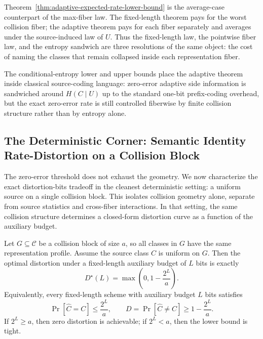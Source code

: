 \begin{remark}
Theorem~\ref{thm:adaptive-expected-rate-lower-bound} is the average-case counterpart of the max-fiber law. The fixed-length theorem pays for the worst collision fiber; the adaptive theorem pays for each fiber separately and averages under the source-induced law of $U$. Thus the fixed-length law, the pointwise fiber law, and the entropy sandwich are three resolutions of the same object: the cost of naming the classes that remain collapsed inside each representation fiber.
\end{remark}

\begin{remark}
The conditional-entropy lower and upper bounds place the adaptive theorem inside classical source-coding language: zero-error adaptive side information is sandwiched around $H(C\mid U)$ up to the standard one-bit prefix-coding overhead, but the exact zero-error rate is still controlled fiberwise by finite collision structure rather than by entropy alone.
\end{remark}

\subsection{The Deterministic Corner: Semantic Identity Rate-Distortion on a Collision Block}

The zero-error threshold does not exhaust the geometry. We now characterize the exact distortion-bits tradeoff in the cleanest deterministic setting: a uniform source on a single collision block. This isolates collision geometry alone, separate from source statistics and cross-fiber interactions. In that setting, the same collision structure determines a closed-form distortion curve as a function of the auxiliary budget.

\begin{theorem}\label{thm:semantic-identity-rate-distortion}
Let $G \subseteq \mathcal{C}$ be a collision block of size $a$, so all classes in $G$ have the same representation profile. Assume the source class $C$ is uniform on $G$. Then the optimal distortion under a fixed-length auxiliary budget of $L$ bits is exactly
\[
D^\star(L)=\max\!\left(0, 1 - \frac{2^L}{a}\right).
\]
Equivalently, every fixed-length scheme with auxiliary budget $L$ bits satisfies
\[
\Pr[\hat C = C] \le \frac{2^L}{a},
\qquad
D = \Pr[\hat C \neq C] \ge 1 - \frac{2^L}{a}.
\]
If $2^L \ge a$, then zero distortion is achievable; if $2^L < a$, then the lower bound is tight.
\end{theorem}


